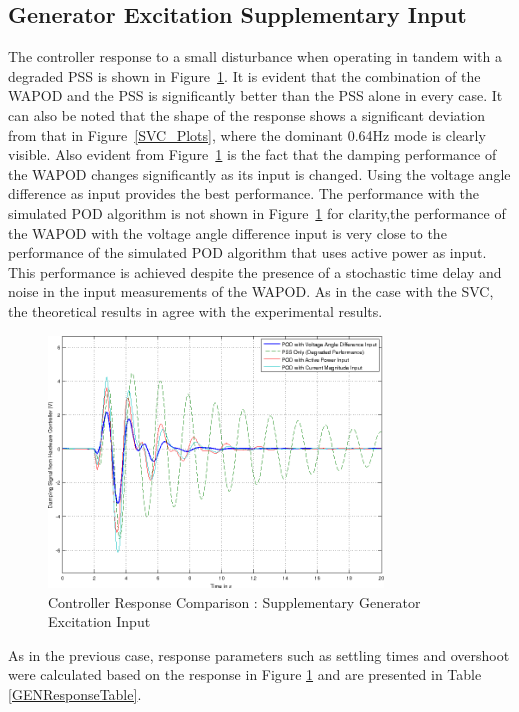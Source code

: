 \documentclass[journal]{IEEEtran}
\begin{document}
\subsection{Generator Excitation Supplementary Input}

The controller response to a small disturbance when operating in tandem with a degraded PSS is shown in Figure~\ref{Generator_Plots}. It is evident that the combination of the WAPOD and the PSS is significantly better than the PSS alone in every case. It can also be noted that the shape of the response shows a significant deviation from that in Figure~\ref{SVC_Plots}, where the dominant 0.64Hz mode is clearly visible. Also evident from Figure~\ref{Generator_Plots} is the fact that the damping performance of the WAPOD changes significantly as its input is changed. Using the voltage angle difference as input provides the best performance. The performance with the simulated POD algorithm is not shown in Figure~\ref{Generator_Plots} for clarity,the performance of the WAPOD with the voltage angle difference input is very close to the performance of the simulated POD algorithm that uses active power as input. This performance is achieved despite the presence of a stochastic time delay and noise in the input measurements of the WAPOD. As in the case with the SVC, the theoretical results in \cite{Yuwa} agree with the experimental results.

\begin{figure}[!th]
\centering
\includegraphics[width=3.5in]{Wide_Area_ResponseComparison_SamePlot.png}
\caption{Controller Response Comparison : Supplementary Generator Excitation Input}
\label{Generator_Plots}
\end{figure}

As in the previous case, response parameters such as settling times and overshoot were calculated based on the response in Figure \ref{Generator_Plots} and are presented in Table \ref{GENResponseTable}.\\
\end{document}
